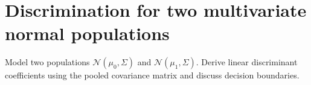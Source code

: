 \section{Discrimination for two multivariate normal populations}

Model two populations $\mathcal{N}(\mu_0,\Sigma)$ and $\mathcal{N}(\mu_1,\Sigma)$.
Derive linear discriminant coefficients using the pooled covariance matrix and discuss decision boundaries.
